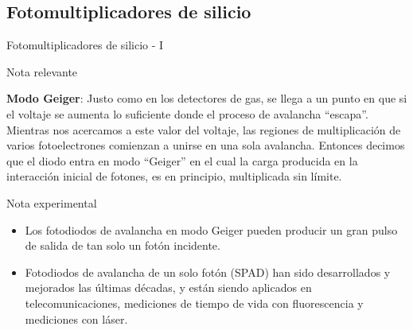 \documentclass[a4paper,10pt]{beamer}
\begin{document}
\subsection{Fotomultiplicadores de silicio}
\begin{frame}{Fotomultiplicadores de silicio - I}

\begin{block}{Nota relevante}
 \begin{justify}
  \textbf{Modo Geiger}: Justo como en los detectores de gas, se llega a un punto en que
  si el voltaje se aumenta lo suficiente donde el proceso de avalancha ``escapa''. Mientras 
  nos acercamos a este valor del voltaje, las regiones de multiplicación de varios 
  fotoelectrones comienzan a unirse en una sola avalancha. Entonces decimos que el 
  diodo entra en modo ``Geiger'' en el cual la carga producida en la interacción inicial 
  de fotones, es en principio, multiplicada sin límite.
 \end{justify}
\end{block}

\begin{exampleblock}{Nota experimental}
 \begin{itemize}
  \item \begin{justify}
         Los fotodiodos de avalancha en modo Geiger pueden producir un gran pulso de 
         salida de tan solo un fotón incidente.
        \end{justify}
  \item \begin{justify}
         Fotodiodos de avalancha de un solo fotón (SPAD) han sido desarrollados y mejorados 
         las últimas décadas, y están siendo aplicados en telecomunicaciones, mediciones 
         de tiempo de vida con fluorescencia y mediciones con láser. 
        \end{justify}


 \end{itemize}

\end{exampleblock}
\end{frame}
\end{document}
